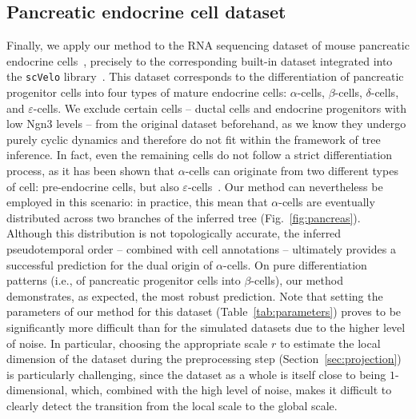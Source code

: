 \documentclass[pdflatex,sn-mathphys-num]{sn-jnl}%
\theoremstyle{thmstyleone}%
\theoremstyle{thmstyletwo}%
\theoremstyle{thmstylethree}%
\begin{document}
\subsection{Pancreatic endocrine cell dataset}
Finally, we apply our method to the RNA sequencing dataset of mouse pancreatic endocrine cells~\cite{bastidasponce_comprehensive_2019}, precisely to the corresponding built-in dataset integrated into the \texttt{scVelo} library~\cite{bergen_generalizing_2020}. This dataset corresponds to the differentiation of pancreatic progenitor cells into four types of mature endocrine cells: $\alpha$-cells, $\beta$-cells, $\delta$-cells, and $\varepsilon$-cells. We exclude certain cells -- ductal cells and endocrine progenitors with low Ngn3 levels -- from the original dataset beforehand, as we know they undergo purely cyclic dynamics and therefore do not fit within the framework of tree inference. In fact, even the remaining cells do not follow a strict differentiation process, as it has been shown that $\alpha$-cells can originate from two different types of cell: pre-endocrine cells, but also $\varepsilon$-cells~\cite{yu_sequential_2021}. Our method can nevertheless be employed in this scenario: in practice, this mean that $\alpha$-cells are eventually distributed across two branches of the inferred tree (Fig.~\ref{fig:pancreas}). Although this distribution is not topologically accurate,  the inferred pseudotemporal order -- combined with cell annotations -- ultimately provides a successful prediction for the dual origin of $\alpha$-cells. On pure differentiation patterns (i.e., of pancreatic progenitor cells into $\beta$-cells), our method demonstrates, as expected, the most robust prediction. Note that setting the parameters of our method for this dataset (Table~\ref{tab:parameters}) proves to be significantly more difficult than for the simulated datasets due to the higher level of noise. In particular, choosing the appropriate scale $r$ to estimate the local dimension of the dataset during the preprocessing step (Section~\ref{sec:projection}) is particularly challenging, since the dataset as a whole is itself close to being $1$-dimensional, which, combined with the high level of noise, makes it difficult to clearly detect the transition from the local scale to the global scale. %
\end{document}
